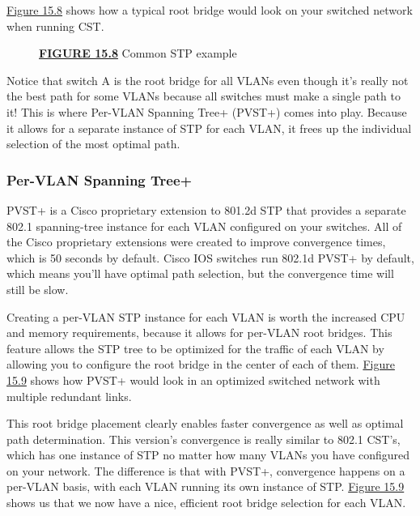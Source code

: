 \protect\hyperlink{c15.xhtmlux5cux23figure15-8}{Figure
15.8} shows how a typical root bridge would look on your switched
network when running CST.

\begin{figure}
\centering
\caption{{\protect\hyperlink{c15.xhtmlux5cux23figureanchor15-8}{\textbf{FIGURE
15.8}} Common STP example}}
\end{figure}

Notice that switch A is the root bridge for all VLANs even though it's
really not the best path for some VLANs because all switches must make a
single path to it! This is where Per-VLAN Spanning Tree+ (PVST+) comes
into play. Because it allows for a separate instance of STP for each
VLAN, it frees up the individual selection of the most optimal path.

\subsubsection[Per-VLAN Spanning
Tree+]{\texorpdfstring{\protect\hypertarget{c15.xhtmlux5cux23c15-sec-14}{}{}Per-VLAN
Spanning Tree+}{Per-VLAN Spanning Tree+}}

PVST+ is a Cisco proprietary extension to 801.2d STP that provides a
separate 802.1 spanning-tree instance for each VLAN configured on your
switches. All of the Cisco proprietary extensions were created to
improve convergence times, which is 50 seconds by default. Cisco IOS
switches run 802.1d PVST+ by default, which means you'll have optimal
path selection, but the convergence time will still be slow.

Creating a per-VLAN STP instance for each VLAN is worth the increased
CPU and memory requirements, because it allows for per-VLAN root
bridges. This feature allows the STP tree to be optimized for the
traffic of each VLAN by allowing you to configure the root bridge in the
center of each of them.
\protect\hyperlink{c15.xhtmlux5cux23figure15-9}{Figure 15.9} shows how
PVST+ would look in an optimized switched network with multiple
redundant links.

This root bridge placement clearly enables faster convergence as well as
optimal path determination. This version's convergence is really similar
to 802.1 CST's, which has one instance of STP no matter how many VLANs
you have configured on your network. The difference is that with PVST+,
convergence happens on a per-VLAN basis, with each VLAN running its own
instance of STP. \protect\hyperlink{c15.xhtmlux5cux23figure15-9}{Figure
15.9} shows us that we now have a nice, efficient root bridge selection
for each VLAN.



